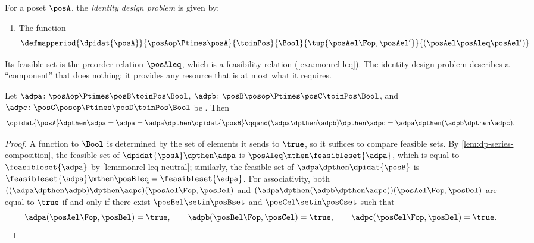 \begin{definition}
    \label{def:dp-identity-series}
    For a poset $\posA$, the \emph{identity design problem} is given by:

    \constit
    \begin{enumerate}
        \item The function
              \begin{equation}
                  \defmapperiod{
                      \dpidat{\posA}
                  }{
                      \posAop \Ptimes \posA
                  }{
                      \toinPos
                  }{
                      \Bool
                  }{
                      \tup{\posAel\Fop, \posAel'}
                  }{
                      (\posAel \posAleq \posAel')
                  }
              \end{equation}
    \end{enumerate}
\end{definition}

Its feasible set is the preorder relation $\posAleq$, which is a feasibility relation (\cref{exa:monrel-leq}).
The identity design problem describes a ``component'' that does nothing: it provides any resource that is at most what it requires.

\begin{lemma}
    \label{lem:dp-series-laws}
    Let $\adpa \colon \posAop \Ptimes \posB \toinPos \Bool$, $\adpb \colon \posB\posop \Ptimes \posC \toinPos \Bool$, and $\adpc \colon \posC\posop \Ptimes \posD \toinPos \Bool$ be .
    Then
    \begin{equation}
        \dpidat{\posA} \dpthen \adpa = \adpa = \adpa \dpthen \dpidat{\posB}
        \qqand
        (\adpa \dpthen \adpb) \dpthen \adpc = \adpa \dpthen (\adpb \dpthen \adpc).
    \end{equation}
\end{lemma}
\begin{proof}
    A function to $\Bool$ is determined by the set of elements it sends to $\true$, so it suffices to compare feasible sets.
    By \cref{lem:dp-series-composition}, the feasible set of $\dpidat{\posA} \dpthen \adpa$ is $\posAleq \mthen \feasibleset{\adpa}$, which is equal to $\feasibleset{\adpa}$ by \cref{lem:monrel-leq-neutral}; similarly, the feasible set of $\adpa \dpthen \dpidat{\posB}$ is $\feasibleset{\adpa} \mthen \posBleq = \feasibleset{\adpa}$.
    For associativity, both $((\adpa \dpthen \adpb) \dpthen \adpc)(\posAel\Fop, \posDel)$ and $(\adpa \dpthen (\adpb \dpthen \adpc))(\posAel\Fop, \posDel)$ are equal to $\true$ if and only if there exist $\posBel \setin \posBset$ and $\posCel \setin \posCset$ such that
    \begin{equation}
        \adpa(\posAel\Fop, \posBel) = \true,
        \qquad
        \adpb(\posBel\Fop, \posCel) = \true,
        \qquad
        \adpc(\posCel\Fop, \posDel) = \true.
    \end{equation}
\end{proof}

